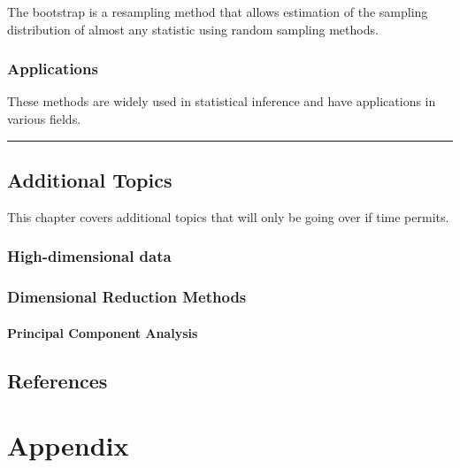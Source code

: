 \documentclass[
  letterpaper,
  DIV=11,
  numbers=noendperiod]{scrreprt}
\begin{document}
{The bootstrap is a resampling method that allows estimation of the
sampling distribution of almost any statistic using random sampling
methods.

\section{Applications}\label{applications}

These methods are widely used in statistical inference and have
applications in various fields.

\begin{center}\rule{0.5\linewidth}{0.5pt}\end{center}


\chapter{Additional Topics}\label{additional-topics}

This chapter covers additional topics that will only be going over if
time permits.

\section{High-dimensional data}\label{high-dimensional-data}

\section{Dimensional Reduction
Methods}\label{dimensional-reduction-methods}

\subsection{Principal Component
Analysis}\label{principal-component-analysis}


\chapter*{References}\label{references}


\label{refs}

\part{Appendix}

}
\end{document}
